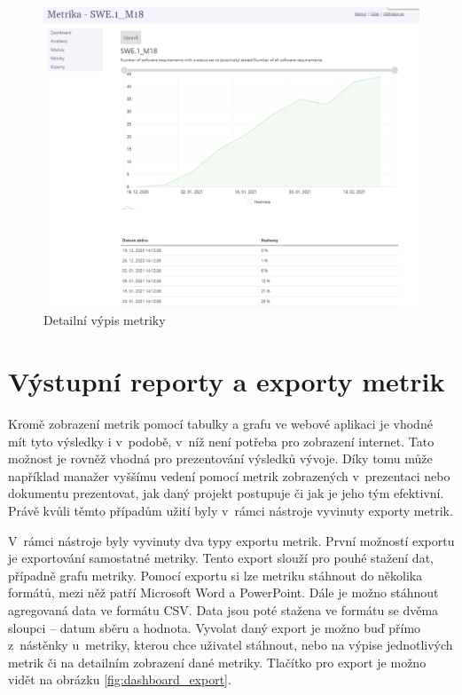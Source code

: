 \documentclass[czech,master]{diploma}
\begin{document}
\begin{figure}[!ht]
    \centering
    \includegraphics[width=1\textwidth]{Diplomka/Figures/metric_detail.png}
    \caption{Detailní výpis metriky}
    \label{fig:metric_detail}
\end{figure}


\section{Výstupní reporty a exporty metrik}
\label{sec:reports}
Kromě zobrazení metrik pomocí tabulky a grafu ve webové aplikaci je vhodné mít tyto výsledky i v~podobě, v~níž není potřeba pro zobrazení internet. Tato možnost je rovněž vhodná pro prezentování výsledků vývoje. Díky tomu může například manažer vyššímu vedení pomocí metrik zobrazených v~prezentaci nebo dokumentu prezentovat, jak daný projekt postupuje či jak je jeho tým efektivní. Právě kvůli těmto případům užití byly v~rámci nástroje vyvinuty exporty metrik.

V~rámci nástroje byly vyvinuty dva typy exportu metrik. První možností exportu je exportování samostatné metriky. Tento export slouží pro pouhé stažení dat, případně grafu metriky. Pomocí exportu si lze metriku stáhnout do několika formátů, mezi něž patří Microsoft Word a PowerPoint. Dále je možno stáhnout agregovaná data ve formátu CSV. Data jsou poté stažena ve formátu se dvěma sloupci -- datum sběru a hodnota. Vyvolat daný export je možno buď přímo z~nástěnky u~metriky, kterou chce uživatel stáhnout, nebo na výpise jednotlivých metrik či na detailním zobrazení dané metriky. Tlačítko pro export je možno vidět na obrázku \ref{fig:dashboard_export}.
\end{document}
